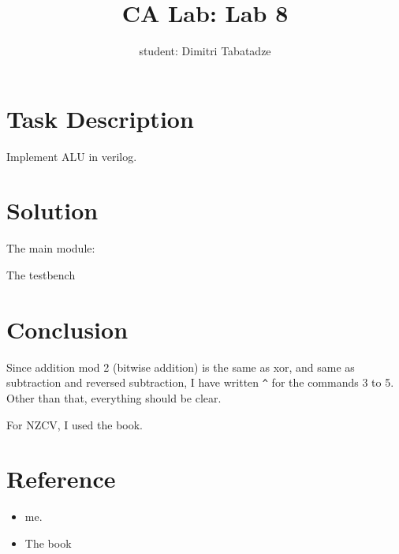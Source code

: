 \documentclass{article}
\title{CA Lab: Lab 8}
\author{student: Dimitri Tabatadze}
\begin{document}
    \maketitle

    \section*{Task Description} 
    
    Implement ALU in verilog.

    \section*{Solution}

    The main module:

    

    The testbench

    

    \section*{Conclusion}

    Since addition mod 2 (bitwise addition) is the same as xor, and same as subtraction and reversed subtraction, I have written \verb|^| for the commands 3 to 5. Other than that, everything should be clear. 

    For NZCV, I used the book. 

    \section*{Reference}
    
    \begin{itemize}
        \item me.
        \item The book
    \end{itemize}
\end{document}
